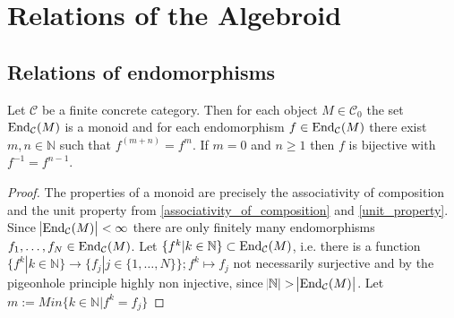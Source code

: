 
\section{Relations of the Algebroid}

\subsection{Relations of endomorphisms}

\begin{lemma}
Let $\mathcal{C}$ be a finite concrete category. Then for each object $M \in \mathcal{C}_{0}$ the set
$\textup{End}_{\mathcal{C}}(M)$ is a monoid and for each endomorphism $f \in \textup{End}_{\mathcal{C}}(M)$
there exist $m,n \in \mathbb{N}$ such that $f^{(m+n)}=f^{m}$. If $m = 0$ and $n \geq 1$ then $f$ is bijective with $f^{-1} = f^{n-1}$.
\begin{proof}
The properties of a monoid are precisely the associativity of composition and the unit property from \ref{associativity_of_composition} and \ref{unit_property}.
Since $\abs{\textup{End}_{\mathcal{C}}(M)}<\infty$ there are only finitely many endomorphisms $f_{1},\dots, f_{N} \in \textup{End}_{\mathcal{C}}(M)$.
Let $\{f^{k} | k \in \mathbb{N} \} \subset \textup{End}_{\mathcal{C}}(M)$, i.e. there is a function 
$\{f^{k} | k \in \mathbb{N}\} \rightarrow \{f_{j} | j \in \{1,\dots,N\}\}; f^{k} \mapsto f_{j}$ not necessarily surjective and 
by the pigeonhole principle highly non injective, since $\abs{\mathbb{N}}>\abs{\textup{End}_{\mathcal{C}}(M)}$.
Let $m := Min \{ k \in \mathbb{N}| f^{k} =  f_{j} \}$

\begin{minipage}{.45\textwidth}\phantom{}\end{minipage}
\end{proof}
\end{lemma}

